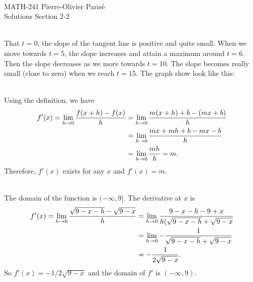 


	\noindent \hrulefill \\
	MATH-241 \hfill Pierre-Olivier Paris{\'e}\\
	Solutions Section 2-2 \hfill \semester \\\vspace*{-1cm}
	
	\noindent\hrulefill
	
	\spc
	
	\\
	That $t = 0$, the slope of the tangent line is positive and quite small. When we move towards $t = 5$, the slope increases and attain a maximum around $t = 6$. Then the slope decreases as we more towards $t = 10$. The slope becomes really small (close to zero) when we reach $t = 15$. The graph show look like this:
	
	\spc
	
	\\
	Using the definition, we have
		\begin{align*}
		f' (x) = \lim_{h \rightarrow 0} \frac{f (x + h) - f(x)}{h} &= \lim_{h \rightarrow 0} \frac{m (x + h) + b - (mx + b)}{h} \\
		&= \lim_{h \rightarrow 0} \frac{mx + mh + b - mx - b}{h} \\
		&= \lim_{h \rightarrow 0} \frac{mh}{h} = m .
		\end{align*}
	Therefore, $f'(x)$ exists for any $x$ and $f'(x) = m$.
	
	\spc
	
	\\
	The domain of the function is $(-\infty, 9]$. The derivative at $x$ is
		\begin{align*}
		f'(x) = \lim_{h \rightarrow 0} \frac{\sqrt{9 - x -h} - \sqrt{9 - x}}{h} &= \lim_{h \rightarrow 0} \frac{9 - x - h - 9 + x}{h (\sqrt{9 - x - h} + \sqrt{9 - x}} \\
		&= \lim_{h \rightarrow 0} -\frac{1}{\sqrt{9 - x- h} + \sqrt{9 -x}} \\
		&= -\frac{1}{2 \sqrt{9 - x}} .
		\end{align*}
	So $f'(x) = -1/2\sqrt{9 - x}$ and the domain of $f'$ is $(-\infty , 9 )$.
	
	\spc
	
